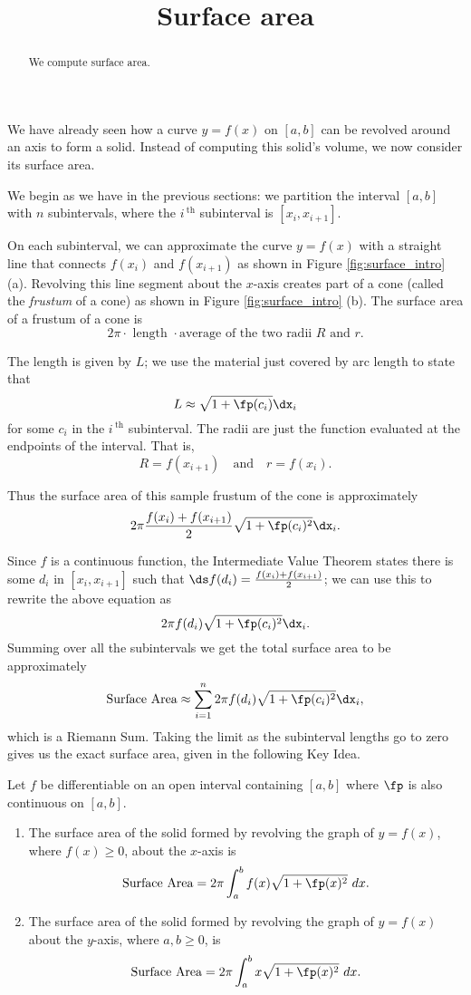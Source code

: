 \documentclass{ximera}
\title[Dig-In:]{Surface area}
\begin{document}
\begin{abstract}
We compute surface area.
\end{abstract}
\maketitle


We have already seen how a curve $y=f(x)$ on $[a,b]$ can be revolved
around an axis to form a solid. Instead of computing this solid's
volume, we now consider its surface area.


We begin as we have in the previous sections: we partition the
interval $[a,b]$ with $n$ subintervals, where the $i\,^{\text{th}}$
subinterval is $[x_i,x_{i+1}]$.

On each subinterval, we can approximate the curve $y=f(x)$ with a
straight line that connects $f(x_i)$ and $f(x_{i+1})$ as shown in
Figure \ref{fig:surface_intro} (a). Revolving this line segment about
the $x$-axis creates part of a cone (called the \textit{frustum} of a
cone) as shown in Figure \ref{fig:surface_intro} (b). The surface area
of a frustum of a cone is
\[
2\pi\cdot\text{ length }\cdot\text{average of the two radii $R$ and
  $r$}.
\]

The length is given by $L$; we use the material just covered by arc
length to state that $$L\approx \sqrt{1+\fp(c_i)}\dx_i$$ for some
$c_i$ in the $i\,^\text{th}$ subinterval. The radii are just the
function evaluated at the endpoints of the interval. That is, $$R =
f(x_{i+1})\quad \text{and}\quad r = f(x_i).$$

Thus the surface area of this sample frustum of the cone is
approximately
$$2\pi\frac{f(x_i)+f(x_{i+1})}2\sqrt{1+\fp(c_i)^2}\dx_i.$$

Since $f$ is a continuous function, the Intermediate Value Theorem
states there is some $d_i$ in $[x_i,x_{i+1}]$ such that $\ds f(d_i) =
\frac{f(x_i)+f(x_{i+1})}2$; we can use this to rewrite the above
equation as
\[
2\pi f(d_i)\sqrt{1+\fp(c_i)^2}\dx_i.
\]
Summing over all the
subintervals we get the total surface area to be approximately
$$\text{Surface Area}\approx \sum_{i=1}^n 2\pi f(d_i)\sqrt{1+\fp(c_i)^2}\dx_i,$$
which is a Riemann Sum. Taking the limit as the subinterval lengths go to zero gives us the exact surface area, given in the following Key Idea.

{Let $f$ be differentiable on an open interval containing $[a,b]$ where $\fp$ is also continuous on $[a,b]$. 
	\begin{enumerate}
	\item	The surface area of the solid formed by revolving the graph of $y=f(x)$, where $f(x)\geq0$, about the $x$-axis is
	$$\text{Surface Area} = 2\pi\int_a^b f(x)\sqrt{1+\fp(x)^2}\ dx.$$
	\item	The surface area of the solid formed by revolving the graph of $y=f(x)$ about the $y$-axis, where $a,b\geq0$, is
	$$\text{Surface Area} = 2\pi\int_a^b x\sqrt{1+\fp(x)^2}\ dx.$$
	\end{enumerate}
}
\end{document}
